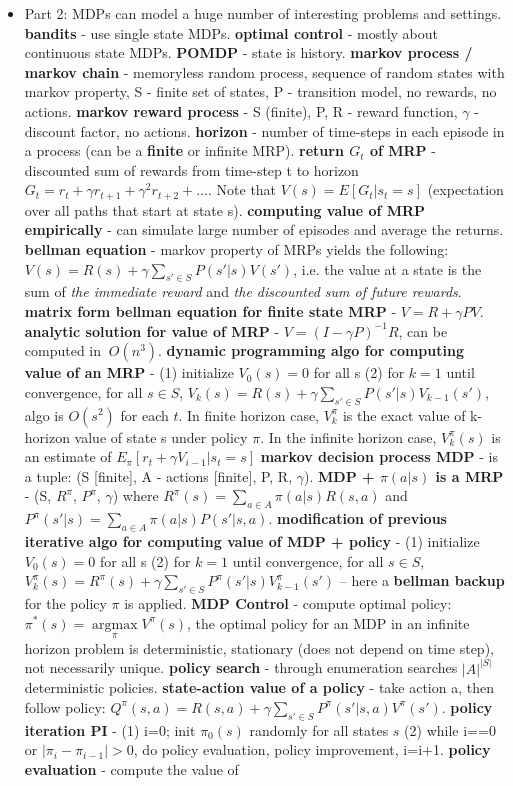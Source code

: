 \documentclass{article}
\begin{document}
\begin{itemize}
\item Part 2: MDPs can model a huge number of interesting problems and settings. \textbf{bandits} - use single state MDPs. \textbf{optimal control} - mostly about continuous state MDPs. \textbf{POMDP} - state is history. \textbf{markov process / markov chain} - memoryless random process, sequence of random states with markov property, S - finite set of states, P - transition model, no rewards, no actions. \textbf{markov reward process} - S (finite), P, R - reward function, $\gamma$ - discount factor, no actions. \textbf{horizon} - number of time-steps in each episode in a process (can be a \textbf{finite} or infinite MRP). \textbf{return $G_t$ of MRP} - discounted sum of rewards from time-step t to horizon $G_t = r_t + \gamma r_{t+1} + \gamma^2 r_{t+2} + ... $. Note that $V(s) = E[G_t | s_t=s]$ (expectation over all paths that start at state s). \textbf{computing value of MRP empirically} - can simulate large number of episodes and average the returns. \textbf{bellman equation} - markov property of MRPs yields the following: $V(s) = R(s) + \gamma \sum \limits_{s' \in S} P(s' | s) V(s') $, i.e. the value at a state is the sum of \textit{the immediate reward} and \textit{the discounted sum of future rewards}. \textbf{matrix form bellman equation for finite state MRP} - $V = R + \gamma P V$. \textbf{analytic solution for value of MRP} - $V = (I - \gamma P)^{-1} R$, can be computed in $~O(n^3)$. \textbf{dynamic programming algo for computing value of an MRP} - (1) initialize $V_0(s) = 0$ for all s (2) for $k = 1$ until convergence, for all $s \in S$, $V_k(s) = R(s) + \gamma \sum \limits_{s' \in S} P(s' | s) V_{k-1}(s') $, algo is $O(s^2)$ for each $t$. In finite horizon case, $V_k^{\pi}$ is the exact value of k-horizon value of state s under policy $\pi$. In the infinite horizon case, $V_k^{\pi}(s)$ is an estimate of $ E_\pi[r_t + \gamma V_{i-1}| s_t=s]$ \textbf{markov decision process MDP} - is a tuple: (S [finite], A - actions [finite], P, R, $\gamma$). \textbf{MDP + $\pi(a|s)$ is a MRP} - (S, $R^\pi$, $P^\pi$, $\gamma$) where $R^\pi(s) = \sum \limits_{a \in A} \pi(a | s) R(s, a) $ and  $P^\pi(s' | s) = \sum \limits_{a \in A} \pi(a | s) P(s'|s, a) $. \textbf{modification of previous iterative algo for computing value of MDP + policy} - (1) initialize $V_0(s) = 0$ for all s (2) for $k = 1$ until convergence, for all $s \in S$, $V_k^\pi(s) = R^\pi(s) + \gamma \sum \limits_{s' \in S} P^\pi(s' | s) V^\pi_{k-1}(s') $ -- here a \textbf{bellman backup} for the policy $\pi$ is applied. \textbf{MDP Control} - compute optimal policy: $\pi^*(s) = \underset{\pi}{\operatorname{argmax}} V^\pi(s) $, the optimal policy for an MDP in an infinite horizon problem is deterministic, stationary (does not depend on time step), not necessarily unique. \textbf{policy search} - through enumeration searches $|A|^{|S|}$ deterministic policies. \textbf{state-action value of a policy} - take action a, then follow policy: $Q^\pi(s, a) = R(s, a) + \gamma \sum \limits_{s' \in S} P^\pi(s' | s, a) V^\pi(s')$. \textbf{policy iteration PI} - (1) i=0; init $\pi_0(s)$ randomly for all states $s$ (2) while i==0 or $|\pi_i - \pi_{i-1}| > 0$, do policy evaluation, policy improvement, i=i+1. \textbf{policy evaluation} - compute the value of 
\end{itemize}
\end{document}
